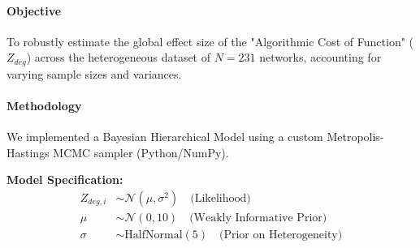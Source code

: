 \begin{table}[h]
\centering
\caption{Selected Results from High-Throughput Validation ($N=231$)}
\label{tab:hpc_results}
\end{table}






\paragraph{Objective}
To robustly estimate the global effect size of the "Algorithmic Cost of Function" ($Z_{deg}$) across the heterogeneous dataset of $N=231$ networks, accounting for varying sample sizes and variances.

\paragraph{Methodology}
We implemented a Bayesian Hierarchical Model using a custom Metropolis-Hastings MCMC sampler (Python/NumPy).

\textbf{Model Specification:}
\begin{align*}
Z_{deg, i} &\sim \mathcal{N}(\mu, \sigma^2) \quad \text{(Likelihood)} \\
\mu &\sim \mathcal{N}(0, 10) \quad \text{(Weakly Informative Prior)} \\
\sigma &\sim \text{HalfNormal}(5) \quad \text{(Prior on Heterogeneity)}
\end{align*}

